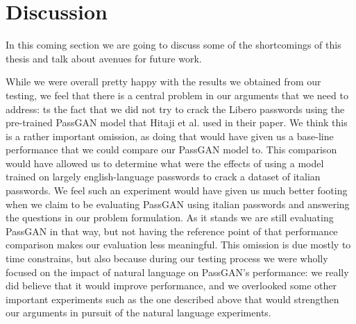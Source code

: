 \section{Discussion}\label{sec:discussion}

In this coming section we are going to discuss some of the shortcomings of this thesis and talk about avenues for future work.

While we were overall pretty happy with the results we obtained from our testing, we feel that there is a central problem in our arguments that we need to address: ts the fact that we did not try to crack the Libero passwords using the pre-trained PassGAN model that Hitaji et al. \cite{PassGAN} used in their paper. We think this is a rather important omission, as doing that would have given us a base-line performance that we could compare our PassGAN model to.  This comparison would have allowed us to determine what were the effects of using a model trained on largely english-language passwords to crack a dataset of italian passwords. We feel such an experiment would have given us much better footing when we claim to be evaluating PassGAN using italian passwords and answering the questions in our problem formulation. As it stands we are still evaluating PassGAN in that way, but not having the reference point of that performance comparison makes our evaluation less meaningful.
This omission is due mostly to time constrains, but also because during our testing process we were wholly focused on the impact of natural language on PassGAN's performance: we really did believe that it would improve performance, and we overlooked some other important experiments such as the one described above that would strengthen our arguments in pursuit of the natural language experiments. 

